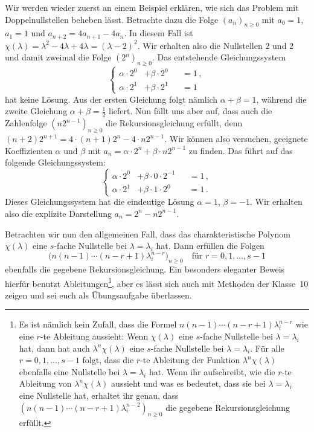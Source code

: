 Wir werden wieder zuerst an einem Beispiel erklären, wie sich das Problem mit Doppelnullstellen beheben lässt. Betrachte dazu die Folge $(a_n)_{n\geqslant 0}$ mit $a_0=1$, $a_1=1$ und $a_{n+2}=4a_{n+1}-4a_n$. In diesem Fall ist $\chi(\lambda)=\lambda^2-4\lambda+4\lambda=(\lambda-2)^2$. Wir erhalten also die Nullstellen $2$ und $2$ und damit zweimal die Folge $(2^n)_{n\geqslant 0}$. Das entstehende Gleichungssystem
\begin{equation*}
	\left\{\begin{alignedat}{2}
		\alpha\cdot 2^0&+\beta\cdot 2^0&&=1\,,\\
		\alpha\cdot 2^1&+\beta\cdot 2^1&&=1
	\end{alignedat}\right.
\end{equation*}
hat keine Lösung. Aus der ersten Gleichung folgt nämlich $\alpha+\beta=1$, während die zweite Gleichung $\alpha+\beta=\frac12$ liefert. Nun fällt uns aber auf, dass auch die Zahlenfolge $(n2^{n-1})_{n\geqslant 0}$ die Rekursionsgleichung erfüllt, denn $(n+2)2^{n+1}=4\cdot (n+1)2^{n}-4\cdot n2^{n-1}$. Wir können also versuchen, geeignete Koeffizienten $\alpha$ und $\beta$ mit $a_n=\alpha\cdot 2^n+\beta\cdot n2^{n-1}$ zu finden. Das führt auf das folgende Gleichungssystem:
\begin{equation*}
	\left\{\begin{alignedat}{2}
		\alpha\cdot 2^0&+\beta\cdot 0\cdot 2^{-1}&&=1\,,\\
		\alpha\cdot 2^1&+\beta\cdot 1\cdot 2^0&&=1\,.
	\end{alignedat}\right.
\end{equation*}
Dieses Gleichungssystem hat die eindeutige Lösung $\alpha=1$, $\beta=-1$. Wir erhalten also die explizite Darstellung $a_n=2^n-n2^{n-1}$.

Betrachten wir nun den allgemeinen Fall, dass das charakteristische Polynom $\chi(\lambda)$ eine $s$-fache Nullstelle bei $\lambda=\lambda_i$ hat. Dann erfüllen die Folgen
\begin{equation*}
	\bigl(n(n-1)\dotsm(n-r+1)\lambda_i^{n-r}\bigr)_{n\geqslant 0}\quad\text{für }r=0,1,\dotsc,s-1
\end{equation*}
ebenfalls die gegebene Rekursionsgleichung. Ein besonders eleganter Beweis hierfür benutzt Ableitungen\footnote{Es ist nämlich kein Zufall, dass die Formel $n(n-1)\dotsm(n-r+1)\lambda_i^{n-r}$ wie eine $r$-te Ableitung aussieht: Wenn $\chi(\lambda)$ eine $s$-fache Nullstelle bei $\lambda=\lambda_i$ hat, dann hat auch $\lambda^n\chi(\lambda)$ eine $s$-fache Nullstelle bei $\lambda=\lambda_i$. Für alle $r=0,1,\dotsc,s-1$ folgt, dass die $r$-te Ableitung der Funktion $\lambda^n\chi(\lambda)$ ebenfalls eine Nullstelle bei $\lambda=\lambda_i$ hat. Wenn ihr aufschreibt, wie die $r$-te Ableitung von $\lambda^n\chi(\lambda)$ aussieht und was es bedeutet, dass sie bei $\lambda=\lambda_i$ eine Nullstelle hat, erhaltet ihr genau, dass $(n(n-1)\dotsm(n-r+1)\lambda_i^{n-2})_{n\geqslant 0}$ die gegebene Rekursionsgleichung erfüllt.}, aber es lässt sich auch mit Methoden der Klasse~10 zeigen und sei euch als Übungsaufgabe überlassen.

